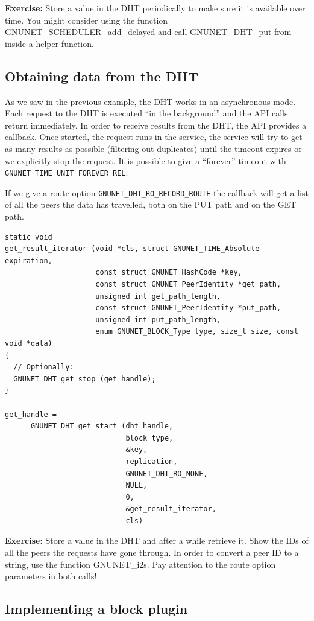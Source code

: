 \documentclass[10pt]{article}
\newcommand{\exercise}[1]{\noindent\begin{boxedminipage}{\textwidth}{\bf Exercise:} #1 \end{boxedminipage}}
\begin{document}
\exercise{Store a value in the DHT periodically to make sure it is available
over time. You might consider using the function GNUNET\_SCHEDULER\_add\_delayed and
call GNUNET\_DHT\_put from inside a helper function.}


\subsection{Obtaining data from the DHT}
As we saw in the previous example, the DHT works in an asynchronous mode.
Each request to the DHT is executed ``in the background'' and the API
calls return immediately. In order to receive results from the DHT, the
API provides a callback. Once started, the request runs in the service,
the service will try to get as many results as possible (filtering out
duplicates) until the timeout expires or we explicitly stop the request.
It is possible to give a ``forever'' timeout with
{\tt GNUNET\_TIME\_UNIT\_FOREVER\_REL}.

If we give a route option {\tt GNUNET\_DHT\_RO\_RECORD\_ROUTE} the callback
will get a list of all the peers the data has travelled, both on the PUT
path and on the GET path.
\lstset{language=C}
\begin{lstlisting}
static void
get_result_iterator (void *cls, struct GNUNET_TIME_Absolute expiration,
                     const struct GNUNET_HashCode *key,
                     const struct GNUNET_PeerIdentity *get_path,
                     unsigned int get_path_length,
                     const struct GNUNET_PeerIdentity *put_path,
                     unsigned int put_path_length,
                     enum GNUNET_BLOCK_Type type, size_t size, const void *data)
{
  // Optionally:
  GNUNET_DHT_get_stop (get_handle);
}

get_handle =
      GNUNET_DHT_get_start (dht_handle,
                            block_type,
                            &key,
                            replication,
                            GNUNET_DHT_RO_NONE,
                            NULL,
                            0,
                            &get_result_iterator,
                            cls)
\end{lstlisting}

\exercise{Store a value in the DHT and after a while retrieve it. Show the IDs of all
the peers the requests have gone through. In order to convert a peer ID to a string, use
the function GNUNET\_i2s. Pay attention to the route option parameters in both calls!}

\subsection{Implementing a block plugin}
\end{document}
